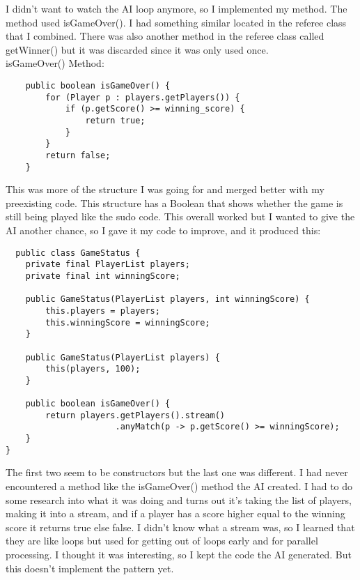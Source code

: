 \documentclass[a4paper,11pt]{article}
\begin{document}
I didn't want to watch the AI loop anymore, so I implemented my method. The method used isGameOver(). I had something similar located in the referee class that I combined. There was also another method in the referee class called getWinner() but it was discarded since it was only used once. \\
isGameOver() Method:
\begin{lstlisting}
    public boolean isGameOver() {
        for (Player p : players.getPlayers()) {
            if (p.getScore() >= winning_score) {
                return true;
            }
        }
        return false;
    }

\end{lstlisting}
This was more of the structure I was going for and merged better with my preexisting code. This structure has a Boolean that shows whether the game is still being played like the sudo code. This overall worked but I wanted to give the AI another chance, so I gave it my code to improve, and it produced this:
\begin{lstlisting}
  public class GameStatus {
    private final PlayerList players;
    private final int winningScore;

    public GameStatus(PlayerList players, int winningScore) {
        this.players = players;
        this.winningScore = winningScore;
    }

    public GameStatus(PlayerList players) {
        this(players, 100);
    }

    public boolean isGameOver() {
        return players.getPlayers().stream()
                      .anyMatch(p -> p.getScore() >= winningScore);
    }
}
\end{lstlisting}
The first two seem to be constructors but the last one was different. I had never encountered a method like the isGameOver() method the AI created. I had to do some research into what it was doing and turns out it's taking the list of players, making it into a stream, and if a player has a score higher equal to the winning score it returns true else false. I didn't know what a stream was, so I learned that they are like loops but used for getting out of loops early and for parallel processing. I thought it was interesting, so I kept the code the AI generated. But this doesn't implement the pattern yet.
\end{document}
